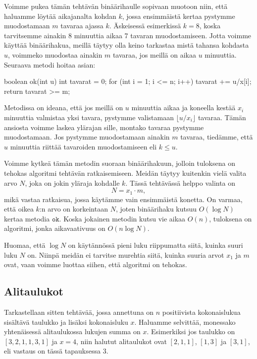 Voimme pukea tämän tehtävän binäärihaulle sopivaan muotoon niin,
että haluamme löytää aikajanalta kohdan $k$, jossa ensimmäistä
kertaa pystymme muodostamaan $m$ tavaraa ajassa $k$.
Äskeisessä esimerkissä $k=8$, koska tarvitsemme ainakin 8
minuuttia aikaa 7 tavaran muodostamiseen.
Jotta voimme käyttää binäärihakua, meillä täytyy olla keino
tarkastaa mistä tahansa kohdasta $u$, voimmeko muodostaa
ainakin $m$ tavaraa, jos meillä on aikaa $u$ minuuttia.
Seuraava metodi hoitaa asian:

\begin{code}
boolean ok(int u) {
    int tavarat = 0;
    for (int i = 1; i <= n; i++) {
        tavarat += u/x[i];
    }
    return tavarat >= m;
}
\end{code}

Metodissa on ideana, että jos meillä on $u$ minuuttia aikaa
ja koneella kestää $x_i$ minuuttia valmistaa yksi tavara,
pystymme valistamaan $\lfloor u/x_i \rfloor$ tavaraa.
Tämän ansiosta voimme laskea ylärajan sille,
montako tavaraa pystymme muodostamaan.
Jos pystymme muodostamaan ainakin $m$ tavaraa,
tiedämme, että $u$ minuuttia riittää tavaroiden muodostamiseen
eli $k \le u$.

Voimme kytkeä tämän metodin suoraan binäärihakuun,
jolloin tuloksena on tehokas algoritmi tehtävän ratkaisemiseen.
Meidän täytyy kuitenkin vielä valita arvo $N$,
joka on jokin yläraja kohdalle $k$.
Tässä tehtävässä helppo valinta on
\[N = x_1 \cdot m,\]
mikä vastaa ratkaisua, jossa käytämme vain ensimmäistä konetta.
On varmaa, että oikea $k$:n arvo on korkeintaan $N$,
joten binäärihaku kutsuu $O(\log N)$ kertaa metodia $\texttt{ok}$.
Koska jokainen metodin kutsu vie aikaa $O(n)$,
tuloksena on algoritmi, jonka aikavaativuus on $O(n \log N)$.

Huomaa, että $\log N$ on käytännössä pieni luku riippumatta
siitä, kuinka suuri luku $N$ on.
Niinpä meidän ei tarvitse murehtia siitä,
kuinka suuria arvot $x_1$ ja $m$ ovat,
vaan voimme luottaa siihen, että algoritmi on tehokas.

\subsection{Alitaulukot}

Tarkastellaan sitten tehtävää, jossa annettuna on $n$
positiivista kokonaislukua sisältävä taulukko ja lisäksi kokonaisluku $x$.
Haluamme selvittää, monessako yhtenäisessä alitaulukossa
lukujen summa on $x$.
Esimerkiksi jos taulukko on $[3,2,1,1,3,1]$ ja $x=4$,
niin halutut alitaulukot ovat $[2,1,1]$, $[1,3]$ ja $[3,1]$,
eli vastaus on tässä tapauksessa $3$.

